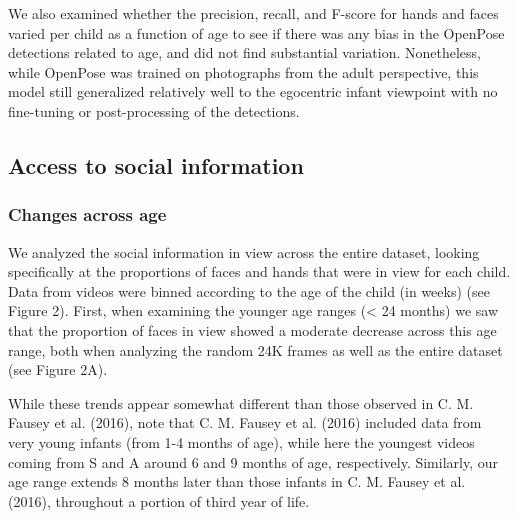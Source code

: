 \documentclass[10pt, letterpaper]{article}
\begin{document}
We also examined whether the precision, recall, and F-score for hands
and faces varied per child as a function of age to see if there was any
bias in the OpenPose detections related to age, and did not find
substantial variation. Nonetheless, while OpenPose was trained on
photographs from the adult perspective, this model still generalized
relatively well to the egocentric infant viewpoint with no fine-tuning
or post-processing of the detections.

\subsection{Access to social
information}\label{access-to-social-information}

\subsubsection{Changes across age}\label{changes-across-age}

We analyzed the social information in view across the entire dataset,
looking specifically at the proportions of faces and hands that were in
view for each child. Data from videos were binned according to the age
of the child (in weeks) (see Figure 2). First, when examining the
younger age ranges (\textless{} 24 months) we saw that the proportion of
faces in view showed a moderate decrease across this age range, both
when analyzing the random 24K frames as well as the entire dataset (see
Figure 2A).

While these trends appear somewhat different than those observed in C.
M. Fausey et al. (2016), note that C. M. Fausey et al. (2016) included
data from very young infants (from 1-4 months of age), while here the
youngest videos coming from S and A around 6 and 9 months of age,
respectively. Similarly, our age range extends 8 months later than those
infants in C. M. Fausey et al. (2016), throughout a portion of third
year of life.
\end{document}
